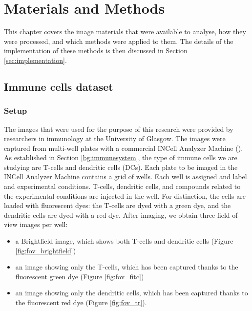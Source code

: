 
\chapter{Materials and Methods} \label{sec:mm}

This chapter covers the image materials that were available to analyse, how they were processed, and which methods were applied to them. The details of the implementation of these methods is then discussed in Section \ref{sec:implementation}.

\section{Immune cells dataset}

\subsection{Setup}

The images that were used for the purpose of this research were provided by researchers in immunology at the University of Glasgow. The images were captured from multi-well plates with a commercial INCell Analyzer Machine (\cite{https://www.gelifesciences.com/en/us/shop/cell-imaging-and-analysis/high-content-analysis-systems/instruments/in-cell-analyzer-2500-hs-high-content-analysis-hca-imaging-system-p-04586}). As established in Section \ref{bg:immunesystem}, the type of immune cells we are studying are T-cells and dendritic cells (DCs). Each plate to be imaged in the INCell Analyzer Machine contains a grid of wells. Each well is assigned and label and experimental conditions. T-cells, dendritic cells, and compounds related to the experimental conditions are injected in the well. For distinction, the cells are loaded with fluorescent dyes: the T-cells are dyed with a green dye, and the dendritic cells are dyed with a red dye. After imaging, we obtain three field-of-view images per well: 

\begin{itemize}
    \item a Brightfield image, which shows both T-cells and dendritic cells (Figure \ref{fig:fov_brightfield})
    \item an image showing only the T-cells, which has been captured thanks to the fluorescent green dye (Figure \ref{fig:fov_fitc})
    \item an image showing only the dendritic cells, which has been captured thanks to the fluorescent red dye (Figure \ref{fig:fov_tr}).
\end{itemize}

